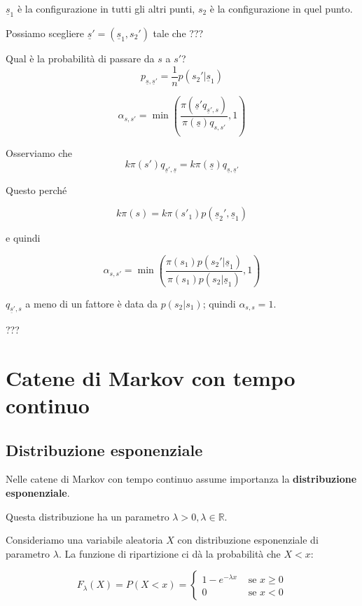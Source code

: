 \documentclass[a4paper,12pt]{book}
\begin{document}
$ \underline{s}_1 $ è la configurazione in tutti gli altri punti, $ s_2 $ è la configurazione in quel punto. %

Possiamo scegliere $ \underline{s}' = (\underline{s}_1, s_2') $ tale che ??? %

Qual è la probabilità di passare da $ s $ a $ s' $?
$$ p_{\underline{s}, \underline{s}'} = \frac{1}{n} p( s_2' | \underline{s}_1 )$$

$$ \alpha_{s,s'} = \min\left( \frac{\pi(\underline{s}' q_{\underline{s}', s})}{\pi(\underline{s}) q_{s,s'}} , 1   \right) $$ %

Osserviamo che 
$$ k\pi(s') q_{\underline{s}', \underline{s}} = k\pi(\underline{s}) q_{\underline{s}, \underline{s}'} $$

Questo perché

$$ k\pi(s) = k\pi(s'_1)p(\underline{s}_2', \underline{s}_1) $$ %

e quindi 

$$ \alpha_{s,s'} = \min \left(\frac{\pi(s_1)p(s_2' | \underline{s}_1)}{\pi(s_1)p(s_2 | \underline{s}_1)}, 1\right) $$

$ q_{\underline{s}', s} $ a meno di un fattore %
è data da $ p(s_2 | s_1) $; quindi $\alpha_{s,s} = 1$. %

??? %

\chapter{Catene di Markov con tempo continuo}

\section{Distribuzione esponenziale}

Nelle catene di Markov con tempo continuo assume importanza la \textbf{distribuzione esponenziale}. 

Questa distribuzione ha un parametro $\lambda > 0, \lambda \in \mathbb{R}$. 

Consideriamo una variabile aleatoria $ X $ con distribuzione esponenziale di parametro $\lambda$. La funzione di ripartizione ci dà la probabilità che $ X < x $:

$$ F_\lambda (X) = P(X < x) = 
\begin{cases}
	1 - e^{ - \lambda x} & \text{ se } x \ge 0 \\
	0 & \text{ se } x < 0
\end{cases} $$
\end{document}
